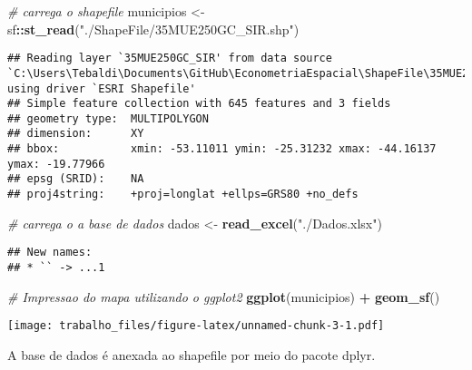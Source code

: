 \documentclass[]{article}
\newenvironment{Shaded}{\begin{snugshade}}{\end{snugshade}}
\newcommand{\KeywordTok}[1]{\textcolor[rgb]{0.13,0.29,0.53}{\textbf{#1}}}
\newcommand{\StringTok}[1]{\textcolor[rgb]{0.31,0.60,0.02}{#1}}
\newcommand{\CommentTok}[1]{\textcolor[rgb]{0.56,0.35,0.01}{\textit{#1}}}
\newcommand{\OperatorTok}[1]{\textcolor[rgb]{0.81,0.36,0.00}{\textbf{#1}}}
\newcommand{\NormalTok}[1]{#1}
\begin{document}
\begin{Shaded}
\begin{Highlighting}[]
\CommentTok{# carrega o shapefile }
\NormalTok{municipios <-}\StringTok{ }\NormalTok{sf}\OperatorTok{::}\KeywordTok{st_read}\NormalTok{(}\StringTok{"./ShapeFile/35MUE250GC_SIR.shp"}\NormalTok{)}
\end{Highlighting}
\end{Shaded}

\begin{verbatim}
## Reading layer `35MUE250GC_SIR' from data source `C:\Users\Tebaldi\Documents\GitHub\EconometriaEspacial\ShapeFile\35MUE250GC_SIR.shp' using driver `ESRI Shapefile'
## Simple feature collection with 645 features and 3 fields
## geometry type:  MULTIPOLYGON
## dimension:      XY
## bbox:           xmin: -53.11011 ymin: -25.31232 xmax: -44.16137 ymax: -19.77966
## epsg (SRID):    NA
## proj4string:    +proj=longlat +ellps=GRS80 +no_defs
\end{verbatim}

\begin{Shaded}
\begin{Highlighting}[]
\CommentTok{# carrega o a base de dados}
\NormalTok{dados <-}\StringTok{ }\KeywordTok{read_excel}\NormalTok{(}\StringTok{"./Dados.xlsx"}\NormalTok{)}
\end{Highlighting}
\end{Shaded}

\begin{verbatim}
## New names:
## * `` -> ...1
\end{verbatim}

\begin{Shaded}
\begin{Highlighting}[]
\CommentTok{# Impressao do mapa utilizando o ggplot2}
\KeywordTok{ggplot}\NormalTok{(municipios) }\OperatorTok{+}\StringTok{ }\KeywordTok{geom_sf}\NormalTok{()}
\end{Highlighting}
\end{Shaded}

\texttt{[image: trabalho\_files/figure-latex/unnamed-chunk-3-1.pdf]}

A base de dados é anexada ao shapefile por meio do pacote dplyr.

\begin{Shaded}
\end{Shaded}
\end{document}
